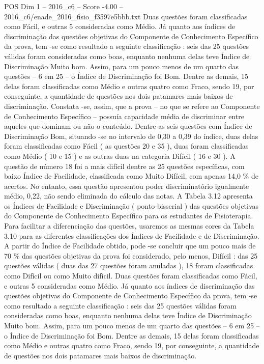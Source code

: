 \begin{textsample}{POS Dim 1 – 2016\_c6 – Score -4.00 – 2016\_c6/enade\_2016\_fisio\_f3597e5bbb.txt}
Duas questões foram classificadas como Fácil, e outras 5 consideradas como Médio.
Já quanto aos índices de discriminação das questões objetivas do Componente de Conhecimento Específico da prova, tem -se como resultado a seguinte classificação : seis das 25 questões válidas foram consideradas como boas, enquanto nenhuma delas teve Índice de Discriminação Muito bom.
Assim, para um pouco menos de um quarto das questões – 6 em 25 – o Índice de Discriminação foi Bom.
Dentre as demais, 15 delas foram classificadas como Médio e outras quatro como Fraco, sendo 19, por conseguinte, a quantidade de questões nos dois patamares mais baixos de discriminação.
Constata -se, assim, que a prova – no que se refere ao Componente de Conhecimento Específico – possuía capacidade média de discriminar entre aqueles que dominam ou não o conteúdo.
Dentre as seis questões com Índice de Discriminação Bom, situando -se no intervalo de 0,30 a 0,39 do índice, duas delas foram classificadas como Fácil ( as questões 20 e 35 ), duas foram classificadas como Médio ( 10 e 15 ) e as outras duas na categoria Difícil ( 16 e 30 ).
A questão de número 18 foi a mais difícil dentre as 25 questões específicas, com baixo Índice de Facilidade, classificada como Muito Difícil, com apenas 14,0 \% de acertos.
No entanto, essa questão apresentou poder discriminatório igualmente médio, 0,22, não sendo eliminada do cálculo das notas.
A Tabela 3.12 apresenta os Índices de Facilidade e Discriminação ( ponto-bisserial ) das questões objetivas do Componente de Conhecimento Específico para os estudantes de Fisioterapia.
Para facilitar a diferenciação das questões, usaremos as mesmas cores da Tabela 3.10 para as diferentes classificações dos Índices de Facilidade e de Discriminação.
A partir do Índice de Facilidade obtido, pode -se concluir que um pouco mais de 70 \% das questões objetivas da prova foi considerado, pelo menos, Difícil : das 25 questões válidas ( duas das 27 questões foram anuladas ), 18 foram classificadas como Difícil ou como Muito difícil.
Duas questões foram classificadas como Fácil, e outras 5 consideradas como Médio.
Já quanto aos índices de discriminação das questões objetivas do Componente de Conhecimento Específico da prova, tem -se como resultado a seguinte classificação : seis das 25 questões válidas foram consideradas como boas, enquanto nenhuma delas teve Índice de Discriminação Muito bom.
Assim, para um pouco menos de um quarto das questões – 6 em 25 – o Índice de Discriminação foi Bom.
Dentre as demais, 15 delas foram classificadas como Médio e outras quatro como Fraco, sendo 19, por conseguinte, a quantidade de questões nos dois patamares mais baixos de discriminação.

\end{textsample}
